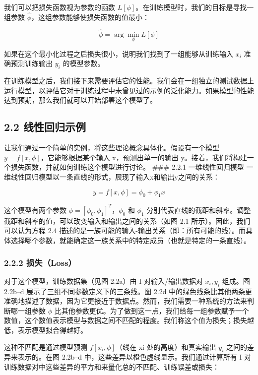 \documentclass[
]{article}
\begin{document}
我们可以把损失函数视为参数的函数
\(L[\phi]\)。在训练模型时，我们的目标是寻找一组参数
\(\hat \phi\)，这组参数能够使损失函数的值最小：

\[
\hat \phi = \arg \mathop{\min}\limits_{\phi} L [\phi] \tag{2.3}
\]

如果在这个最小化过程之后损失很小，说明我们找到了一组能够从训练输入
\(x_i\) 准确预测训练输出 \(y_i\) 的模型参数。

在训练模型之后，我们接下来需要评估它的性能。我们会在一组独立的测试数据上运行模型，以评估它对于训练过程中未曾见过的示例的泛化能力。如果模型的性能达到预期，那么我们就可以开始部署这个模型了。

\hypertarget{ux7ebfux6027ux56deux5f52ux793aux4f8b}{%
\subsection{2.2
线性回归示例}\label{ux7ebfux6027ux56deux5f52ux793aux4f8b}}

让我们通过一个简单的实例，将这些理论概念具体化。假设有一个模型
\(y = f[x, \phi]\)，它能够根据某个输入 x，预测出单一的输出
y。接着，我们将构建一个损失函数，并就如何训练这个模型进行讨论。 \#\#\#
2.2.1 一维线性回归模型
一维线性回归模型以一条直线的形式，展现了输入x和输出y之间的关系：

\[
y = f[x, \phi] = \phi_0 + \phi_1 x \tag{2.4}
\]

这个模型有两个参数 \(\phi = [\phi_0,\phi_1]^T\)，\(\phi_0\) 和
\(\phi_1\)
分别代表直线的截距和斜率。调整截距和斜率的值，可以改变输入和输出之间的关系（如图
2.1 所示）。因此，我们可以认为方程 2.4
描述的是一族可能的输入-输出关系（即：所有可能的线）。而具体选择哪个参数，就能确定这一族关系中的特定成员（也就是特定的一条直线）。

\hypertarget{ux635fux5931loss}{%
\subsubsection{2.2.2 损失（Loss）}\label{ux635fux5931loss}}

对于这个模型，训练数据集（见图 2.2a）由 I 对输入/输出数据对
\({x_i, y_i}\) 组成。图 2.2b--d 展示了三组不同参数定义下的三条线。图
2.2d
中的绿色线条比其他两条更准确地描述了数据，因为它更接近于数据点。然而，我们需要一种系统的方法来判断哪一组参数
\(\phi\)
比其他参数更优。为了做到这一点，我们给每一组参数赋予一个数值，这个数值表示模型与数据之间不匹配的程度。我们称这个值为损失；损失越低，表示模型拟合得越好。

这种不匹配是通过模型预测 \(f[x_i,\phi]\)（线在 xi 处的高度）和真实输出
\(y_i\) 之间的差异来表示的。在图 2.2b--d
中，这些差异以橙色虚线显示。我们通过计算所有 I
对训练数据对中这些差异的平方和来量化总的不匹配、训练误差或损失：
\end{document}

